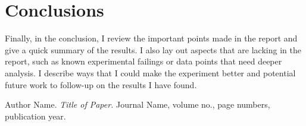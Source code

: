 \documentclass[preprint]{aastex}
\begin{document}
\section{Conclusions}

Finally, in the conclusion, I review the important points made in the report 
and give a quick summary of the results. I also lay out aspects that are 
lacking in the report, such as known experimental failings or data points that 
need deeper analysis. I describe ways that I could make the experiment better 
and potential future work to follow-up on the results I have found.

\begin{thebibliography}{0}
  Author Name. \emph{Title of Paper.} Journal Name, volume no., page numbers, 
  publication year.
\end{thebibliography}
\end{document}
